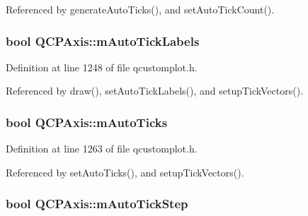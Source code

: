 Referenced by generate\+Auto\+Ticks(), and set\+Auto\+Tick\+Count().

\hypertarget{class_q_c_p_axis_a721e496b342f272078c5ff84564e472f}{}
\subsubsection[{m\+Auto\+Tick\+Labels}]{\setlength{\rightskip}{0pt plus 5cm}bool Q\+C\+P\+Axis\+::m\+Auto\+Tick\+Labels\hspace{0.3cm}{\ttfamily [protected]}}\label{class_q_c_p_axis_a721e496b342f272078c5ff84564e472f}


Definition at line 1248 of file qcustomplot.\+h.



Referenced by draw(), set\+Auto\+Tick\+Labels(), and setup\+Tick\+Vectors().

\hypertarget{class_q_c_p_axis_aac23adcbae246bf165d4539ad65ac9f9}{}
\subsubsection[{m\+Auto\+Ticks}]{\setlength{\rightskip}{0pt plus 5cm}bool Q\+C\+P\+Axis\+::m\+Auto\+Ticks\hspace{0.3cm}{\ttfamily [protected]}}\label{class_q_c_p_axis_aac23adcbae246bf165d4539ad65ac9f9}


Definition at line 1263 of file qcustomplot.\+h.



Referenced by set\+Auto\+Ticks(), and setup\+Tick\+Vectors().

\hypertarget{class_q_c_p_axis_aada8934a5c44978653031782aa37d101}{}
\subsubsection[{m\+Auto\+Tick\+Step}]{\setlength{\rightskip}{0pt plus 5cm}bool Q\+C\+P\+Axis\+::m\+Auto\+Tick\+Step\hspace{0.3cm}{\ttfamily [protected]}}\label{class_q_c_p_axis_aada8934a5c44978653031782aa37d101}


